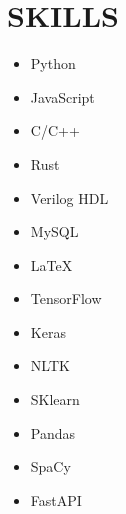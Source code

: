 \documentclass[11pt,letter,sans]{moderncv} %
\begin{document}
\section{SKILLS}
    \begin{cvcolumns}
        {
            \vspace{-0.5em}
                \begin{itemize}
                    \item Python
                    \item JavaScript
                    \item C/C++
                    \item Rust
                    \item Verilog HDL
                    \item MySQL
                    \item \LaTeX
                \end{itemize}
        }
        {
            \vspace{-.5em}
                \begin{itemize}
                        \item TensorFlow
                        \item Keras
                        \item NLTK
                        \item SKlearn
                        \item Pandas
                        \item SpaCy
                        \item FastAPI
                \end{itemize}
        }
        

\end{cvcolumns}
\end{document}
